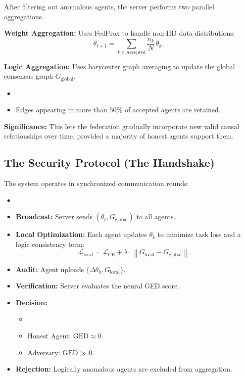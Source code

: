 \documentclass[journal]{IEEEtran}
\begin{document}
After filtering out anomalous agents, the server performs two parallel aggregations.

\textbf{Weight Aggregation:}
Uses FedProx to handle non-IID data distributions:
\[
\theta_{t+1}
=
\sum_{k \in \text{Accepted}}
\frac{n_k}{N}\,\theta_k. \]

\textbf{Logic Aggregation:}
Uses barycenter graph averaging to update the global consensus graph $G_{\text{global}}$.

\begin{itemize}
\item  \item Edges appearing in more than $50\%$ of accepted agents are retained. \end{itemize}

\textbf{Significance:}
This lets the federation gradually incorporate new valid causal relationships over time, provided a majority of honest agents support them.

\subsection{The Security Protocol (The Handshake)}

The system operates in synchronized communication rounds:

\begin{itemize}
\item  \item \textbf{Broadcast:} Server sends $(\theta_t, G_{\text{global}})$ to all agents. \item \textbf{Local Optimization:} Each agent updates $\theta_k$ to minimize task loss and a logic consistency term:
 \[
 \mathcal{L}_{\text{local}}
 =
 \mathcal{L}_{\text{CE}}
 +
 \lambda \cdot
 \left\|
 G_{\text{local}} - G_{\text{global}}
 \right\|. \]
 \item \textbf{Audit:} Agent uploads $\{\Delta \theta_k, G_{\text{local}}\}$. \item \textbf{Verification:} Server evaluates the neural GED score. \item \textbf{Decision:}
 \begin{itemize}
\item  \item Honest Agent: $\text{GED} \approx 0$. \item Adversary: $\text{GED} \gg 0$. \end{itemize}
 \item \textbf{Rejection:} Logically anomalous agents are excluded from aggregation. \end{itemize}
\end{document}
